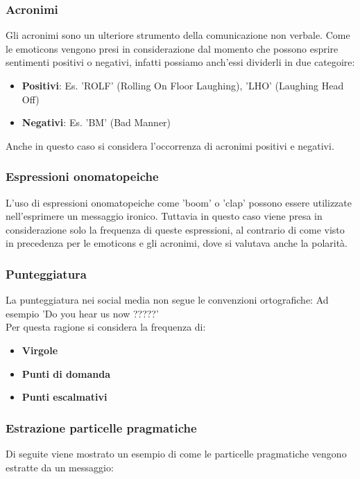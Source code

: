 \documentclass[oneside]{book}
\begin{document}
\subsubsection{Acronimi}
Gli acronimi sono un ulteriore strumento della comunicazione non verbale. Come le emoticons vengono presi in considerazione dal momento che possono esprire sentimenti positivi o negativi, infatti possiamo anch'essi dividerli in due categoire:

\begin{itemize}
	\item
	\textbf{Positivi}: Es. 'ROLF' (Rolling On Floor Laughing), 'LHO' (Laughing Head Off)
	\item
	\textbf{Negativi}: Es. 'BM' (Bad Manner)
\end{itemize}
Anche in questo caso si considera l'occorrenza di acronimi positivi e negativi.

\subsubsection{Espressioni onomatopeiche}
L'uso di espressioni onomatopeiche come 'boom' o 'clap' possono essere utilizzate nell'esprimere un messaggio ironico. Tuttavia in questo caso viene presa in considerazione solo la frequenza di queste espressioni, al contrario di come visto in precedenza per le emoticons e gli acronimi, dove si valutava anche la polarità.

\subsubsection{Punteggiatura}
La punteggiatura nei social media non segue le convenzioni ortografiche: Ad esempio 'Do you hear us now ?????'\\
Per questa ragione si considera la frequenza di:
\begin{itemize}
	\item \textbf{Virgole}
	
	\item \textbf{Punti di domanda}
	
	\item \textbf{Punti escalmativi}
\end{itemize}

\subsubsection{Estrazione particelle pragmatiche}
Di seguite viene mostrato un esempio di come le particelle pragmatiche vengono estratte da un messaggio:
\end{document}
